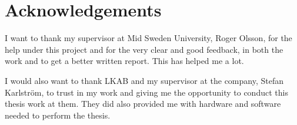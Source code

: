 \chapter*{Acknowledgements}
I want to thank my supervisor at Mid Sweden University, Roger Olsson, for the help under this project and for the very clear and good feedback, in both the work and to get a better written report.
This has helped me a lot.

\bigskip

I would also want to thank LKAB and my supervisor at the company, Stefan Karlström, to trust in my work and giving me the opportunity to conduct this thesis work at them. 
They did also provided me with hardware and software needed to perform the thesis.



